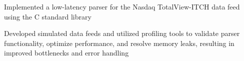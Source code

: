 \item Implemented a low-latency parser for the Nasdaq TotalView-ITCH data feed using the C standard library
\item Developed simulated data feeds and utilized profiling tools to validate parser functionality, optimize
  performance, and resolve memory leaks, resulting in improved bottlenecks and error handling
